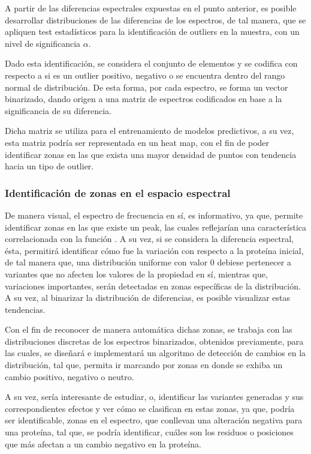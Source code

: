 A partir de las diferencias espectrales expuestas en el punto anterior, es posible desarrollar distribuciones de las diferencias de los espectros, de tal manera, que se apliquen test estadísticos para la identificación de outliers en la muestra, con un nivel de significancia $\alpha$.

Dado esta identificación, se considera el conjunto de elementos y se codifica con respecto a si es un outlier positivo, negativo o se encuentra dentro del rango normal de distribución. De esta forma, por cada espectro, se forma un vector binarizado, dando origen a una matriz de espectros codificados en base a la significancia de su diferencia.

Dicha matriz se utiliza para el entrenamiento de modelos predictivos, a su vez, esta matriz podría ser representada en un heat map, con el fin de poder identificar zonas en las que exista una mayor densidad de puntos con tendencia hacia un tipo de outlier.

\subsubsection{Identificación de zonas en el espacio espectral}

De manera visual, el espectro de frecuencia en sí, es informativo, ya que, permite identificar zonas en las que existe un peak, las cuales reflejarían una característica correlacionada con la función \cite{vijayakumar1998electrostatic}. A su vez, si se considera la diferencia espectral, ésta, permitirá identificar cómo fue la variación con respecto a la proteína inicial, de tal manera que, una distribución uniforme con valor 0 debiese pertenecer a variantes que no afecten los valores de la propiedad en sí, mientras que, variaciones importantes, serán detectadas en zonas específicas de la distribución. A su vez, al binarizar la distribución de diferencias, es posible visualizar estas tendencias. 

Con el fin de reconocer de manera automática dichas zonas, se trabaja con las distribuciones discretas de los espectros binarizados, obtenidos previamente, para las cuales, se diseñará e implementará un algoritmo de detección de cambios en la distribución, tal que, permita ir marcando por zonas en donde se exhiba un cambio positivo, negativo o neutro. 

A su vez, sería interesante de estudiar, o, identificar las variantes generadas y sus correspondientes efectos y ver cómo se clasifican en estas zonas, ya que, podría ser identificable, zonas en el espectro, que conllevan una alteración negativa para una proteína, tal que, se podría identificar, cuáles son los residuos o posiciones que más afectan a un cambio negativo en la proteína. 


